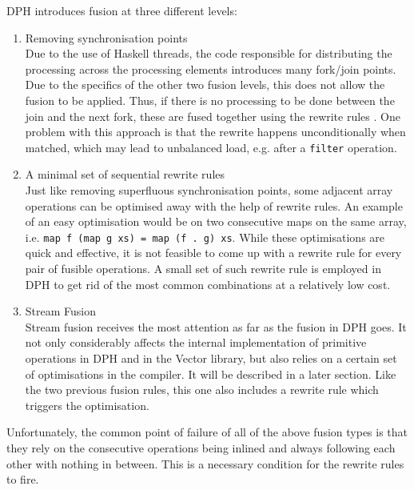 \documentclass[preamble.tex]{subfiles}
\begin{document}
\label{Lit:DPH-fusion-levels}DPH introduces fusion at three different
levels:
\begin{enumerate}
\item Removing synchronisation points\\ Due to the use of Haskell threads, the code responsible for distributing the processing across the processing elements introduces many fork/join points. Due to the specifics of the other two fusion levels, this does not allow the fusion to be applied. Thus, if there is no processing to be done between the join and the next fork, these are fused together using the rewrite rules \cite{PTH01}. One problem with this approach is that the rewrite happens unconditionally when matched, which may lead to unbalanced load, e.g. after a \texttt{filter} operation.
\item A minimal set of sequential rewrite rules\\ Just like removing superfluous synchronisation points, some adjacent array operations can be optimised away with the help of rewrite rules. An example of an easy optimisation would be on two consecutive maps on the same array, i.e. \texttt{map f (map g xs) = map (f . g) xs}. While these optimisations are quick and effective, it is not feasible to come up with a rewrite rule for every pair of fusible operations. A small set of such rewrite rule is employed in DPH to get rid of the most common combinations at a relatively low cost.
\item Stream Fusion\\ Stream fusion receives the most attention as far as the fusion in DPH goes. It not only considerably affects the internal implementation of primitive operations in DPH and in the Vector library, but also relies on a certain set of optimisations in the compiler. It will be described in a later section. Like the two previous fusion rules, this one also includes a rewrite rule which triggers the optimisation.
\end{enumerate}


Unfortunately, the common point of failure of all of the above fusion types is that they rely on the consecutive operations being inlined and always following each other with nothing in between. This is a necessary condition for the rewrite rules to fire.


\IfNotCompilingAll{}
\end{document}
